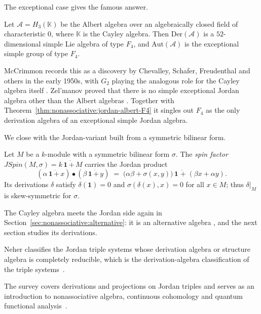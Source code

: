 The exceptional case gives the famous answer.

\begin{theorem}
\label{thm:nonassociative:jordan-albert-F4}
Let $\mathcal{A}=H_3(\mathbb{K})$ be the Albert algebra over an
algebraically closed field of characteristic $0$, where $\mathbb{K}$
is the Cayley algebra. Then $\mathrm{Der}(\mathcal{A})$ is a
$52$-dimensional simple Lie algebra of type $F_4$, and
$\mathrm{Aut}(\mathcal{A})$ is the exceptional simple group of type
$F_4$.
\end{theorem}

McCrimmon records this as a discovery by Chevalley, Schafer, Freudenthal
and others in the early 1950s, with $G_2$ playing the analogous role for
the Cayley algebra itself \cite[p.~52]{McCrimmon2004Taste}. Zel'manov
proved that there is no simple exceptional Jordan algebra other
than the Albert algebras \cite[pp.~103--111]{Zelmanov1979Prime}. Together
with Theorem~\ref{thm:nonassociative:jordan-albert-F4} it singles out
$F_4$ as the only derivation algebra of an exceptional simple Jordan
algebra.

We close with the Jordan-variant built from a symmetric bilinear form.

\begin{example}
\label{ex:nonassociative:jordan-spin}
Let $M$ be a $k$-module with a symmetric bilinear form $\sigma$. The
\emph{spin factor}
$JSpin(M,\sigma) = k\,\mathbf{1}\,\dot{+}\,M$ carries the Jordan
product
\[
(\alpha\,\mathbf{1}\,\dot{+}\,x)\bullet(\beta\,\mathbf{1}\,\dot{+}\,y)
\;=\;\bigl(\alpha\beta+\sigma(x,y)\bigr)\,\mathbf{1}\;\dot{+}\;
(\beta x+\alpha y).
\]
Its derivations $\delta$ satisfy $\delta(\mathbf{1})=0$ and
$\sigma(\delta(x),x)=0$ for all $x\in M$; thus $\delta|_{M}$ is
skew-symmetric for $\sigma$.
\end{example}

The Cayley algebra meets the Jordan side again in
Section~\ref{sec:nonassociative:alternative}: it is an alternative
algebra \cite[p.~148]{Baez2002Octonions}, and the next section studies
its derivations.

Neher classifies the Jordan triple systems whose derivation algebra or
structure algebra is completely reducible, which is the derivation-algebra
classification of the triple
systems~\cite{WlJordanTripleSystemsWithComplet1984}.

The survey covers derivations and projections on Jordan triples and serves as
an introduction to nonassociative algebra, continuous cohomology and quantum
functional analysis~\cite{WlDerivationsAndProjectionsOnJor2020}.
